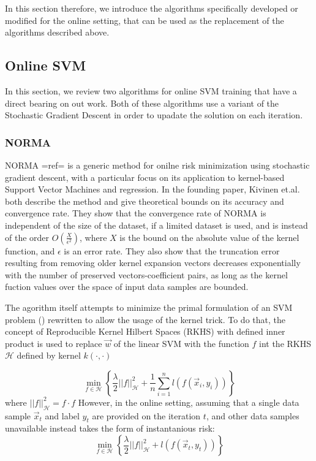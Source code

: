 {In this section therefore, we introduce the algorithms specifically developed or modified for the online setting, that can be used as the replacement of the algorithms described above. 
\subsection{Online SVM}
In this section, we review two algorithms for online SVM training that have a direct bearing on out work. Both of these algorithms use a variant of the Stochastic Gradient Descent in order to upadate the solution on each iteration. 
\subsubsection{NORMA}
\label{NORMAIntro}
NORMA {{=ref=}} is a generic method for onilne risk minimization using stochastic gradient descent, with a particular focus on its application to kernel-based Support Vector Machines and regression. In the founding paper,  Kivinen et.al. both describe the method and give theoretical  bounds on its accuracy and convergence rate. They show that the convergence rate of NORMA is independent of the size of the dataset, if a limited dataset is used, and is instead of the order $O(\frac{X}{\epsilon^2})$, where $X$ is the bound on the absolute value of the kernel function, and $\epsilon$ is an error rate. 
They also show that the truncation error resulting from removing older kernel expansion vectors decreases exponentially with the number of preserved vectors-coefficient pairs, as long as the kernel fuction values over the space of input data samples are bounded. 

The agorithm itself attempts to minimize the primal formulation of an SVM problem () rewritten to allow the usage of the kernel trick. To do that, the concept of Reproducible Kernel Hilbert Spaces (RKHS) with defined inner product is used to replace $\vec{w}$ of the linear SVM with the function $f$ int the RKHS $\mathscr{H}$  defined by kernel $k(\cdot,\cdot)$

\begin{equation}
\label{kernelPrimal}
 \min_{f \in \mathscr{H}} \left\{ \frac{\lambda}{2}||f||_\mathscr{H} ^2 +\frac{1}{n}\sum_{i=1}^{n}l(f(\vec{x}_i,y_i))\right\}
\end{equation}
where $||f||_\mathscr{H} ^2=f\cdot f$
However, in the online setting, assuming that a single data sample $\vec{x}_t$ and label $y_t$ are provided on the iteration $t$, and other data samples unavailable  instead takes the form of instantanious risk: 
\begin{equation}
\label{kernelPrimalInst}
 \min_{f \in \mathscr{H}} \left\{ \frac{\lambda}{2}||f||_\mathscr{H} ^2 +l(f(\vec{x}_t,y_t))\right\}
\end{equation}

}
